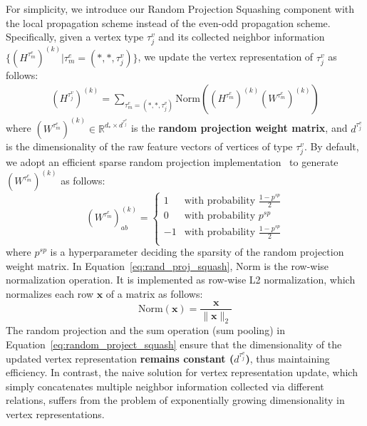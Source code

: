 \documentclass[lettersize,journal]{IEEEtran}
\begin{document}
For simplicity, we introduce our Random Projection Squashing component with the local propagation scheme instead of the even-odd propagation scheme. 
Specifically, given a vertex type $\tau^{v}_{j}$ and its collected neighbor information $\{(H^{\tau^{e}_{m}})^{(k)} | \tau^{e}_{m} = (*, *, \tau^{v}_{j})\}$, we update the vertex representation of $\tau^{v}_{j}$ as follows:
\begin{equation}\label{eq:random_project_squash}
\begin{aligned}
    (H^{\tau^{v}_{j}})^{(k)} = \sum \limits_{\tau^{e}_{m} = (*, *, \tau^{v}_{j})} \bm{\mathrm{Norm}}((H^{\tau^{e}_{m}})^{(k)} (W^{\tau^{e}_{m}})^{(k)})
\end{aligned}
\end{equation}
where $(W^{\tau^{e}_{m}})^{(k)} \in \mathbb{R}^{d_{*} \times d^{\tau^{v}_{j}}}$ is the \textbf{random projection weight matrix}, and $d^{\tau^{v}_{j}}$ is the dimensionality of the raw feature vectors of vertices of type $\tau^{v}_{j}$.
By default, we adopt an efficient sparse random projection implementation~\cite{DBLP:conf/pods/Achlioptas01} to generate $(W^{\tau^{e}_{m}})^{(k)}$ as follows:
\begin{equation}\label{eq:rand_proj_squash}
(W^{\tau^{e}_{m}})^{(k)}_{ab} = \begin{cases}
    1 & \text{with probability } \frac{1-p^{sp}}{2} \\
    0 & \text{with probability } p^{sp} \\
    -1 & \text{with probability } \frac{1-p^{sp}}{2}  \\
\end{cases}
\end{equation}
where $p^{sp}$ is a hyperparameter deciding the sparsity of the random projection weight matrix.
In Equation~\ref{eq:rand_proj_squash}, $\bm{\mathrm{Norm}}$ is the row-wise normalization operation.
It is implemented as row-wise L2 normalization, which normalizes each row $\mathbf{x}$ of a matrix as follows:
\begin{equation}
    \bm{\mathrm{Norm}}(\mathbf{x}) = \frac{\mathbf{x}}{\lVert \mathbf{x} \rVert_2}
\end{equation}
The random projection and the sum operation (sum pooling) in Equation~\ref{eq:random_project_squash} ensure that the dimensionality of the updated vertex representation \textbf{remains constant ($d^{\tau^{v}_{j}}$)}, thus maintaining efficiency.
In contrast, the naive solution for vertex representation update, which simply concatenates multiple neighbor information collected via different relations, suffers from the problem of exponentially growing dimensionality in vertex representations.
\end{document}
